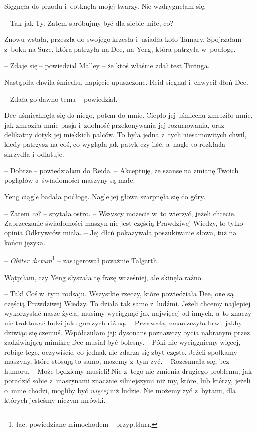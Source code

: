 \documentclass[oneside,polish,11pt,sfheadings]{mwbk}
\begin{document}
Sięgnęła do przodu i~dotknęła mojej twarzy. Nie wzdrygnęłam się. 

-- Tak jak Ty. Zatem spróbujmy być dla siebie miłe, co?

Znowu wstała, przeszła do swojego krzesła i~usiadła koło Tamary.
Spojrzałam z~boku na Suze, która patrzyła na Dee, na Yeng, która
patrzyła w~podłogę.

-- Zdaje się -- powiedział Malley -- że ktoś właśnie zdał test Turinga.

Nastąpiła chwila śmiechu, napięcie upuszczone. Reid sięgnął i~chwycił
dłoń Dee. 

-- Zdała go dawno temu -- powiedział.

Dee uśmiechnęła się do niego, potem do mnie. Ciepło jej uśmiechu
zmroziło mnie, jak zmroziła mnie pasja i~zdolność przekonywania jej
rozumowania, oraz delikatny dotyk jej miękkich palców. To była jedna z~tych niesamowitych chwil, kiedy patrzysz na coś, co wygląda jak patyk
czy liść, a~nagle to rozkłada skrzydła i~odlatuje.

-- Dobrze -- powiedziałam do Reida. -- Akceptuję, że szanse na zmianę
Twoich poglądów o~świadomości maszyny są małe.

Yeng ciągle badała podłogę. Nagle jej głowa szarpnęła się do góry. 

-- Zatem \textit{co}? -- spytała ostro. -- Wszyscy możecie w~to wierzyć, jeżeli
chcecie. Zaprzeczanie świadomości maszyn nie jest częścią Prawdziwej
Wiedzy, to tylko opinia Odkrywców miała\ldots  -- Jej dłoń pokazywała
poszukiwanie słowa, tuż na końcu języka.

-- \textit{Obiter dictum}\footnote{ łac. powiedziane mimochodem -- przyp.tłum.} -- zasugerował poważnie Talgarth.

Wątpiłam, czy Yeng słyszała tę frazę wcześniej, ale skinęła raźno. 

-- Tak! Coś w~tym rodzaju. Wszystkie rzeczy, które powiedziała Dee, one są
częścią Prawdziwej Wiedzy. To działa tak samo z~ludźmi. Jeżeli chcemy
najlepiej wykorzystać nasze życia, musimy wyciągnąć jak najwięcej od
innych, a~to znaczy nie traktować ludzi jako gorszych niż są. -- Przerwała, zmarszczyła brwi, jakby dziwiąc się czemuś. Współczułam jej:
dysonans poznawczy bycia nabranym przez zadziwiającą mimikrę Dee musiał
być bolesny. -- Póki nie wyciągniemy więcej, robiąc tego, oczywiście, co
jednak nie zdarza się zbyt często. Jeżeli spotkamy maszyny, które
stosują to samo, możemy z~tym żyć. -- Roześmiała się, bez humoru. -- Może
będziemy musieli! Nic z~tego nie zmienia drugiego problemu, jak poradzić
sobie z~maszynami znacznie silniejszymi niż my, które, lub którzy,
jeżeli o~mnie chodzi, mogliby być \textit{więcej} niż ludzie. Nie możemy
żyć z~bytami, dla których jesteśmy niczym mrówki.
\end{document}
